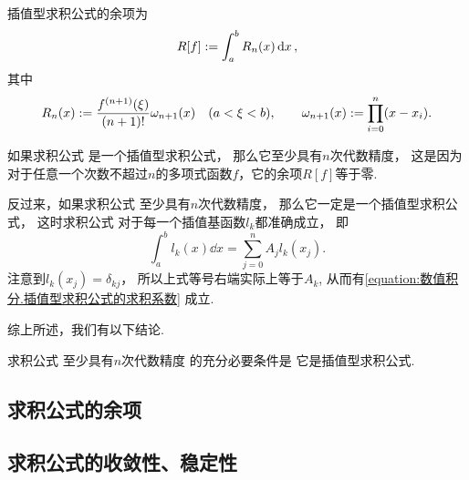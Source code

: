 插值型求积公式的余项为\begin{equation}
	R[f] := \int_a^b R_n(x) \dd{x},
\end{equation}
其中\begin{equation*}
	R_n(x) := \frac{f^{(n+1)}(\xi)}{(n+1)!} \omega_{n+1}(x)
	\quad(a<\xi<b),
	\qquad
	\omega_{n+1}(x)
	:=
	\prod_{i=0}^n (x - x_i).
\end{equation*}

如果求积公式  是一个插值型求积公式，
那么它至少具有\(n\)次代数精度，
这是因为对于任意一个次数不超过\(n\)的多项式函数\(f\)，它的余项\(R[f]\)等于零.

反过来，如果求积公式  至少具有\(n\)次代数精度，
那么它一定是一个插值型求积公式，
这时求积公式 
对于每一个插值基函数\(l_k\)都准确成立，
即\begin{equation*}
	\int_a^b l_k(x) \dd{x}
	= \sum_{j=0}^n A_j l_k(x_j).
\end{equation*}
注意到\(l_k(x_j) = \delta_{kj}\)，
所以上式等号右端实际上等于\(A_k\),
从而有\cref{equation:数值积分.插值型求积公式的求积系数} 成立.

综上所述，我们有以下结论.
\begin{theorem}
求积公式  至少具有\(n\)次代数精度
的充分必要条件是
它是插值型求积公式.
\end{theorem}

\subsection{求积公式的余项}

\subsection{求积公式的收敛性、稳定性}
